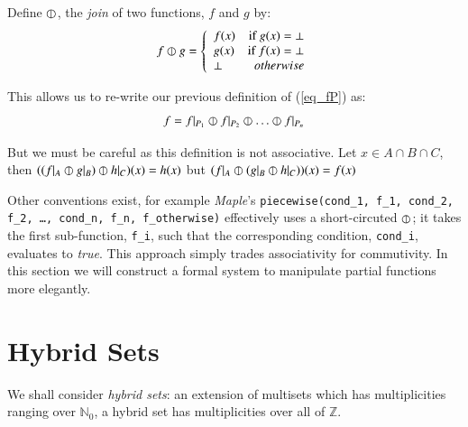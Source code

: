 \begin{definition}
	Define $\varobar$, the \emph{join} of two functions, $f$ and $g$ by:
	\begin{equation}
	\label{def:fjoin}
		f \varobar g =  
		\left\{
	     		\begin{array}{lr}
	       		f(x) & \text{if } g(x) = \bot \\
	       		g(x) & \text{if } f(x) = \bot \\
	       		\bot & otherwise
	     		\end{array}
	   	\right.
	\end{equation}
\end{definition}


This allows us to re-write our previous definition of (\ref{eq_fP}) as:
\begin{equation}
	\label{fjoin_partition}
	f = f|_{P_1} \varobar f|_{P_2} \varobar \ldots \varobar f|_{P_n}
\end{equation}


But we must be careful as this definition is not associative.
Let $x \in A \cap B \cap C$, 
then $( (f|_{A} \varobar g|_{B} ) \varobar h|_{C} )(x) = h(x)$ 
but $( f|_{A} \varobar ( g|_{B} \varobar h|_{C} ))(x) = f(x)$


Other conventions exist, for example \emph{Maple}'s 
\texttt{piecewise(cond\_1, f\_1, cond\_2, f\_2, \ldots, cond\_n, f\_n, f\_otherwise)} 
effectively uses a short-circuted $\varobar$;
it takes the first sub-function, \texttt{f\_i}, such that the corresponding condition, \texttt{cond\_i}, evaluates to \emph{true}.
This approach simply trades associativity for commutivity.
In this section we will construct a formal system to manipulate partial functions more elegantly.




%
%
\section{Hybrid Sets}


We shall consider \emph{hybrid sets}: 
an extension of multisets which has multiplicities ranging over $\mathbb{N}_0$, 
a hybrid set has multiplicities over all of $\mathbb{Z}$.

